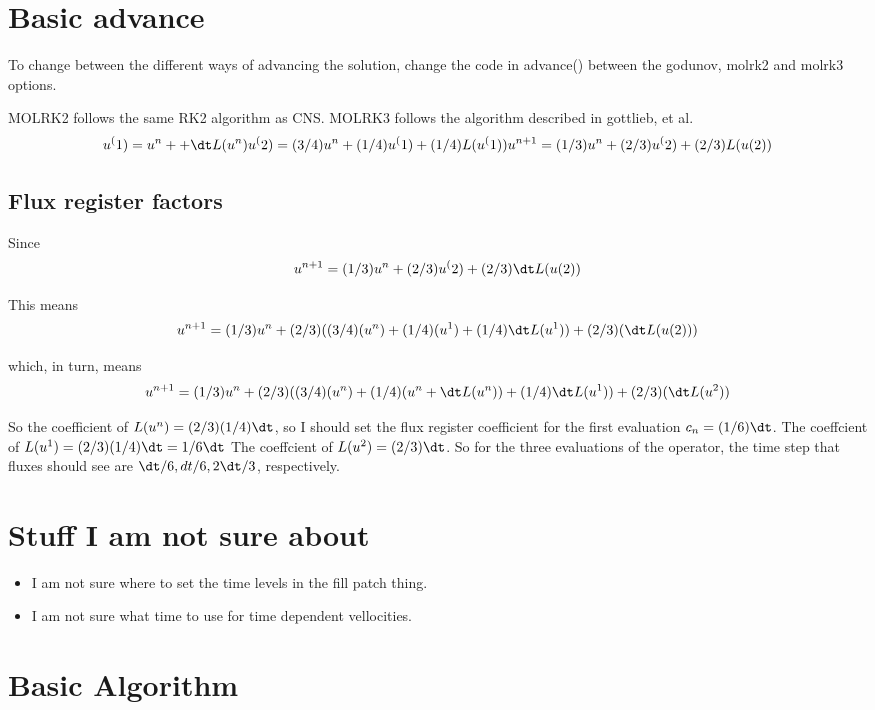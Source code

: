 \section{Basic advance}
To change between the different ways of advancing the solution, change
the code in advance() between the godunov, molrk2 and molrk3 options.

MOLRK2 follows the same RK2 algorithm as CNS.
MOLRK3 follows the algorithm described in gottlieb, et al.
$$
u^(1) = u^n +  + \dt L(u^n)  \\
u^(2) = (3/4) u^n + (1/4) u^(1)  + (1/4) L(u^(1))
u^{n+1} = (1/3) u^n + (2/3) u^(2)  + (2/3) L(u(2))
$$

\subsection{Flux register factors}

Since 
$$
u^{n+1} = (1/3) u^n + (2/3) u^(2)  + (2/3) \dt L(u(2))
$$

This means 
$$
u^{n+1} = (1/3) u^n + (2/3)((3/4)(u^n) + (1/4)(u^1) + (1/4)\dt L(u^1))  + (2/3)( \dt L(u(2)))
$$

which, in turn, means
$$
u^{n+1} = (1/3) u^n + (2/3)((3/4)(u^n) + (1/4)(u^n + \dt L(u^n)) + (1/4)\dt L(u^1))  + (2/3)( \dt L(u^2))
$$

So the coefficient of $L(u^n) = (2/3)(1/4)\dt$, so I should set the
flux register coefficient for the first evaluation $c_n = (1/6)\dt$.
The coeffcient of $L(u^1) = (2/3)(1/4)\dt = 1/6 \dt$
The coeffcient of $L(u^2) = (2/3) \dt$.   So for the three evaluations
of the operator, the time step  that fluxes should see are $\dt/6,
dt/6, 2\dt/3$, respectively.


\section{Stuff I am not sure about}

\begin{itemize}
  \item I am not sure where to set the time levels  in the fill patch thing.
  \item I am not sure what time to use for time dependent
    vellocities.   
\end{itemize}


\section{Basic Algorithm}

